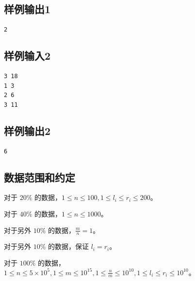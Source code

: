 \subsection{样例输出1}

\begin{lstlisting}
2
\end{lstlisting}

\subsection{样例输入2}

\begin{lstlisting}
3 18 
1 3
2 6
3 11
\end{lstlisting}

\subsection{样例输出2}

\begin{lstlisting}
6
\end{lstlisting}

\subsection{数据范围和约定}

对于 $20\%$ 的数据，$1 \le n \le 100,1 \le l_i \le r_i \le 200$。

对于 $40\%$ 的数据，$1 \le n \le 1000$。

对于另外 $10\%$ 的数据，$\frac{m}{n} = 1$。

对于另外 $10\%$ 的数据，保证 $l_i = r_i$。

对于 $100\%$ 的数据，$1 \le n \le 5 \times 10^5,1 \le m \le 10^{15},1 \le \frac{n}{m} \le 10^{10},1 \le l_i \le r_i \le 10^{10}$。
